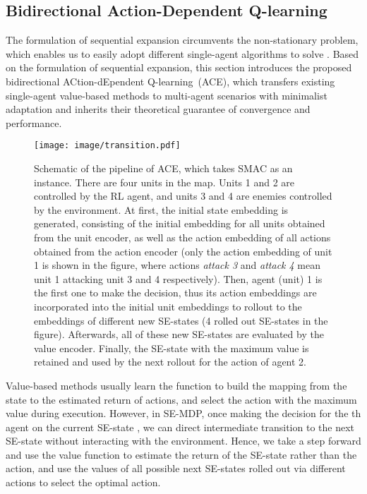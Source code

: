 \documentclass[letterpaper]{article} \usepackage{aaai23}  \usepackage{times}  \usepackage{helvet}  \usepackage{courier}  \usepackage[hyphens]{url}  \usepackage{graphicx} \urlstyle{rm} \def\UrlFont{\rm}  \usepackage{natbib}  \usepackage{caption} \frenchspacing  \setlength{\pdfpagewidth}{8.5in} \setlength{\pdfpageheight}{11in} \usepackage{algorithm}
\begin{document}
\subsection{Bidirectional Action-Dependent Q-learning}
\vspace{-0.5ex}
The formulation of sequential expansion  circumvents the non-stationary problem, which enables us to easily adopt different single-agent algorithms to solve . Based on the formulation of sequential expansion, this section introduces the proposed bidirectional ACtion-dEpendent Q-learning~(ACE), which transfers existing single-agent value-based methods to multi-agent scenarios with minimalist adaptation and inherits their theoretical guarantee of convergence and performance.

\begin{figure*}[t]
    \centering
    \texttt{[image: image/transition.pdf]}
\vspace{-2ex}
    \caption{Schematic of the pipeline of ACE, which takes SMAC as an instance. There are four units in the map. Units 1 and 2 are controlled by the RL agent, and units 3 and 4 are enemies controlled by the environment. At first, the initial state embedding is generated, consisting of the initial embedding for all units obtained from the unit encoder, as well as the action embedding of all actions obtained from the action encoder (only the action embedding of unit 1 is shown in the figure, where actions \emph{attack 3} and \emph{attack 4} mean unit 1 attacking unit 3 and 4 respectively). Then, agent (unit) 1 is the first one to make the decision, thus its action embeddings are incorporated into the initial unit embeddings to rollout to the embeddings of different new SE-states  (4 rolled out SE-states in the figure). Afterwards, all of these new SE-states are evaluated by the value encoder. Finally, the SE-state with the maximum value is retained and used by the next rollout for the action of agent 2.}
\vspace{-4ex}
    \label{fig:transition}
\end{figure*}


Value-based methods usually learn the function  to build the mapping from the state to the estimated return of actions, and select the action with the maximum  value during execution. However, in SE-MDP, once making the decision  for the th agent on the current SE-state , we can direct intermediate transition to the next SE-state  without interacting with the environment. Hence, we take a step forward and use the value function  to estimate the return of the SE-state rather than the action, and use the values  of all possible next SE-states rolled out via different actions  to select the optimal action.
\end{document}
